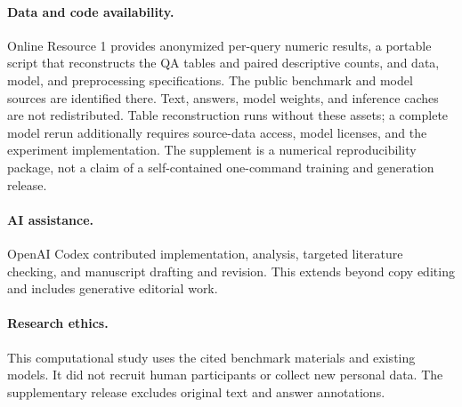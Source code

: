 \documentclass[pdflatex,sn-mathphys-num]{sn-jnl}
\begin{document}
\paragraph{Data and code availability.}
Online Resource 1 provides anonymized per-query numeric results, a portable
script that reconstructs the QA tables and paired descriptive counts, and
data, model, and preprocessing specifications. The public benchmark and
model sources are identified there. Text, answers, model weights, and
inference caches are not redistributed. Table reconstruction runs without
these assets; a complete model rerun additionally requires source-data
access, model licenses, and the experiment implementation. The supplement
is a numerical reproducibility package, not a claim of a self-contained
one-command training and generation release.
\paragraph{AI assistance.}
OpenAI Codex contributed implementation, analysis, targeted literature
checking, and manuscript drafting and revision. This extends beyond
copy editing and includes generative editorial work.
\paragraph{Research ethics.}
This computational study uses the cited benchmark materials and existing
models. It did not recruit human participants or collect new personal data.
The supplementary release excludes original text and answer annotations.


\end{document}
